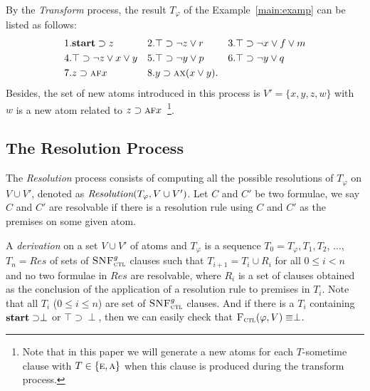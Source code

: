 \documentclass[letterpaper]{article} %
\begin{document}
\begin{example}\label{examp:Tran}
By the \emph{Transform} process, the result $T_{\varphi}$ of the Example~\ref{main:examp} can be listed as follows:
\begin{align*}
& 1. \textbf{start}\supset z && 2. \top \supset \neg z \vee r && 3.\top \supset \neg x\vee f \vee m\\
& 4. \top \supset \neg z \vee x \vee y && 5.\top \supset \neg y \vee p && 6.\top \supset \neg y \vee q\\
& 7. z \supset \textsc{a} \textsc{f} x && 8. y \supset \textsc{a} \textsc{x}(x\vee y).
\end{align*}
Besides, the set of new atoms introduced in this process is $V'=\{x, y,z, w\}$ with $w$ is a new atom related to $z \supset \textsc{a} \textsc{f} x$~\footnote{Note that in this paper we will generate a new atoms for each $T$-sometime clause with $T\in \{\textsc{e}, \textsc{a}\}$ when this clause is produced during the transform process.}. %
\end{example}




\subsection{The Resolution Process}
The \emph{Resolution} process consists of computing all the possible resolutions of $T_{\varphi}$ on $V\cup V'$, denoted as $\emph{Resolution}(T_{\varphi}, V\cup V')$.
Let $C$ and $C'$ be two formulae, we say $C$ and $C'$ are resolvable if there is a resolution rule using $C$ and $C'$ as the premises on some given atom. 

A \emph{derivation} on a set $V\cup V'$ of atoms and $T_{\varphi}$ is a sequence $T_0=T_{\varphi}, T_1, T_2$, $\dots$, $T_n=Res$ of sets of ${\textsc{SNF}_{\textsc{ctl}}^g}$ clauses such that $T_{i+1} = T_i \cup R_i$ for all $0\leq i < n$ and no two formulae in $Res$ are resolvable, where $R_i$ is a set of clauses obtained as the conclusion of the application of a resolution rule to premises in $T_i$.
Note that all $T_i$ ($0 \leq i \leq n$) are set of ${\textsc{SNF}_{\textsc{ctl}}^g}$ clauses. 
And if there is a $T_i$ containing $\textbf{start}\supset \perp$ or $\top\supset \perp$, then we can easily check that ${\textsc{F}_{\textsc{ctl}}}(\varphi, V)\equiv\perp$.
\end{document}
